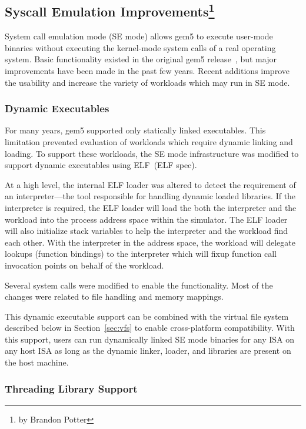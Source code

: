 \subsection[Syscall Emulation Improvements]{Syscall Emulation Improvements\footnote{by Brandon Potter}}

System call emulation mode (SE mode) allows gem5 to execute user-mode binaries without executing the kernel-mode system calls of a real operating system.
Basic functionality existed in the original gem5 release~\cite{Binkert-gem5-2011}, but major improvements have been made in the past few years.
Recent additions improve the usability and increase the variety of workloads which may run in SE mode.

\subsubsection{Dynamic Executables}

For many years, gem5 supported only statically linked executables.
This limitation prevented evaluation of workloads which require dynamic linking and loading.
To support these workloads, the SE mode infrastructure was modified to support dynamic executables using ELF~\cite{}(ELF spec).

At a high level, the internal ELF loader was altered to detect the requirement of an interpreter---the tool responsible for handling dynamic loaded libraries.
If the interpreter is required, the ELF loader will load the both the interpreter and the workload into the process address space within the simulator.
The ELF loader will also initialize stack variables to help the interpreter and the workload find each other.
With the interpreter in the address space, the workload will delegate lookups (function bindings) to the interpreter which will fixup function call invocation points on behalf of the workload.

Several system calls were modified to enable the functionality.
Most of the changes were related to file handling and memory mappings.

This dynamic executable support can be combined with the virtual file system described below in Section~\ref{sec:vfs} to enable cross-platform compatibility.
With this support, users can run dynamically linked SE mode binaries for any ISA on any host ISA as long as the dynamic linker, loader, and libraries are present on the host machine.

\subsubsection{Threading Library Support}

